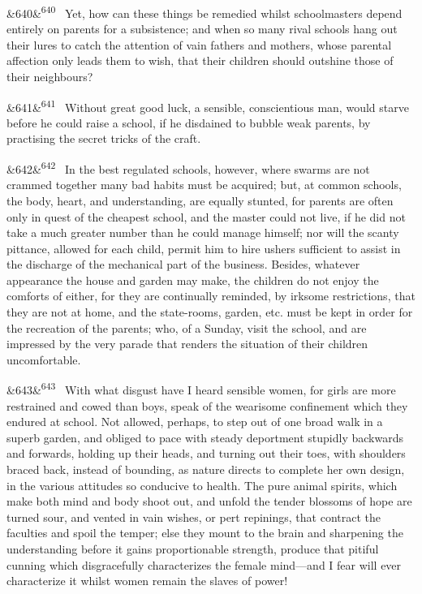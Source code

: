 \documentclass[12pt]{article}
\newcommand{\para}[1][]{\par\noindent\ifx&#1&\else\textsuperscript{\footnotesize #1}~\fi}
\begin{document}
\para[640] Yet, how can these things be remedied whilst schoolmasters depend entirely on parents for a subsistence; and when so many rival schools hang out their lures to catch the attention of vain fathers and mothers, whose parental affection only leads them to wish, that their children should outshine those of their neighbours?

\para[641] Without great good luck, a sensible, conscientious man, would starve before he could raise a school, if he disdained to bubble weak parents, by practising the secret tricks of the craft.

\para[642] In the best regulated schools, however, where swarms are not crammed together many bad habits must be acquired; but, at common schools, the body, heart, and understanding, are equally stunted, for parents are often only in quest of the cheapest school, and the master could not live, if he did not take a much greater number than he could manage himself; nor will the scanty pittance, allowed for each child, permit him to hire ushers sufficient to assist in the discharge of the mechanical part of the business. Besides, whatever appearance the house and garden may make, the children do not enjoy the comforts of either, for they are continually reminded, by irksome restrictions, that they are not at home, and the state-rooms, garden, etc. must be kept in order for the recreation of the parents; who, of a Sunday, visit the school, and are impressed by the very parade that renders the situation of their children uncomfortable.

\para[643] With what disgust have I heard sensible women, for girls are more restrained and cowed than boys, speak of the wearisome confinement which they endured at school. Not allowed, perhaps, to step out of one broad walk in a superb garden, and obliged to pace with steady deportment stupidly backwards and forwards, holding up their heads, and turning out their toes, with shoulders braced back, instead of bounding, as nature directs to complete her own design, in the various attitudes so conducive to health. The pure animal spirits, which make both mind and body shoot out, and unfold the tender blossoms of hope are turned sour, and vented in vain wishes, or pert repinings, that contract the faculties and spoil the temper; else they mount to the brain and sharpening the understanding before it gains proportionable strength, produce that pitiful cunning which disgracefully characterizes the female mind---and I fear will ever characterize it whilst women remain the slaves of power!
\end{document}
